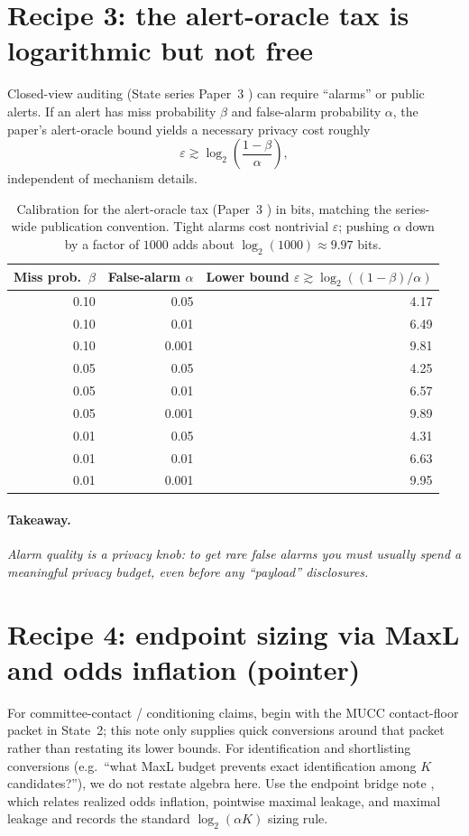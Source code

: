 \documentclass[11pt]{article}
\newcommand{\takeaway}[1]{\paragraph{Takeaway.}\emph{#1}}
\begin{document}
\section{Recipe 3: the alert-oracle tax is logarithmic but not free}
Closed-view auditing (State series Paper~3 \cite{state3}) can require ``alarms'' or public alerts. If an alert has miss probability $\beta$ and false-alarm probability $\alpha$, the paper's alert-oracle bound yields a necessary privacy cost roughly
\[
\varepsilon \gtrsim \log_2\!\left(\frac{1-\beta}{\alpha}\right),
\]
independent of mechanism details.

\begin{table}[h]
\centering
\begin{tabular}{@{}rrr@{}}
\toprule
Miss prob.\ $\beta$ & False-alarm $\alpha$ & Lower bound $\varepsilon \gtrsim \log_2((1-\beta)/\alpha)$ \\
\midrule
0.10 & 0.05  & 4.17 \\
0.10 & 0.01  & 6.49 \\
0.10 & 0.001 & 9.81 \\
0.05 & 0.05  & 4.25 \\
0.05 & 0.01  & 6.57 \\
0.05 & 0.001 & 9.89 \\
0.01 & 0.05  & 4.31 \\
0.01 & 0.01  & 6.63 \\
0.01 & 0.001 & 9.95 \\
\bottomrule
\end{tabular}
\caption{Calibration for the alert-oracle tax (Paper~3 \cite{state3}) in bits, matching the series-wide publication convention. Tight alarms cost nontrivial $\varepsilon$; pushing $\alpha$ down by a factor of $1000$ adds about $\log_2(1000)\approx 9.97$ bits.}
\label{tab:alert-tax-calibration}
\end{table}

\takeaway{Alarm quality is a privacy knob: to get rare false alarms you must usually spend a meaningful privacy budget, even before any ``payload'' disclosures.}

\section{Recipe 4: endpoint sizing via MaxL and odds inflation (pointer)}
For committee-contact / conditioning claims, begin with the MUCC contact-floor packet in State~2; this note only supplies quick conversions around that packet rather than restating its lower bounds.\cite{state2}
For identification and shortlisting conversions (e.g.\ ``what MaxL budget prevents exact identification among $K$ candidates?''), we do not restate algebra here.
Use the endpoint bridge note \cite{synth5}, which relates realized odds inflation, pointwise maximal leakage, and maximal leakage and records the standard $\log_2(\alpha K)$ sizing rule.
\end{document}

